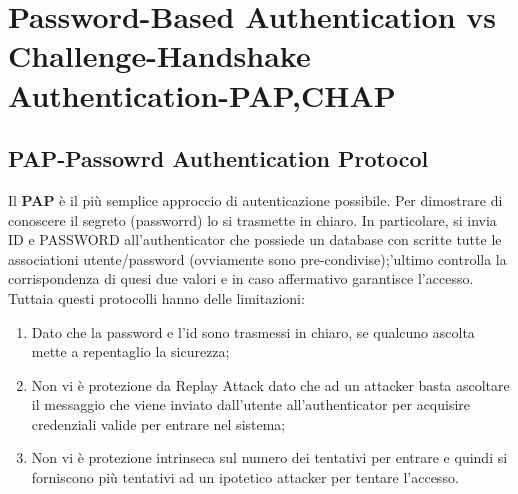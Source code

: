 \documentclass{book}
\theoremstyle{remark}
\begin{document}
\section{Password-Based Authentication vs Challenge-Handshake Authentication-PAP,CHAP}
\subsection{PAP-Passowrd Authentication Protocol}
Il \textbf{PAP} è il più semplice approccio di autenticazione possibile\@. Per dimostrare di conoscere il segreto (passworrd) lo si trasmette in chiaro\@. In particolare, si invia ID e PASSWORD all'authenticator che possiede un database con scritte tutte le associationi utente/password (ovviamente sono pre-condivise);\@quest'ultimo controlla la corrispondenza di quesi due valori e in caso affermativo garantisce l'accesso\@.\newline
Tuttaia questi protocolli hanno delle limitazioni:\begin{enumerate}
	\item Dato che la password e l'id sono trasmessi in chiaro, se qualcuno ascolta mette a repentaglio la sicurezza;\@
	\item Non vi è protezione da Replay Attack dato che ad un attacker basta ascoltare il messaggio che viene inviato dall'utente all'authenticator per acquisire credenziali valide  per entrare nel sistema;\@
	\item Non vi è protezione intrinseca sul numero dei tentativi per entrare e quindi si forniscono più tentativi ad un ipotetico attacker per tentare l'accesso\@.
\end{enumerate}
\end{document}

